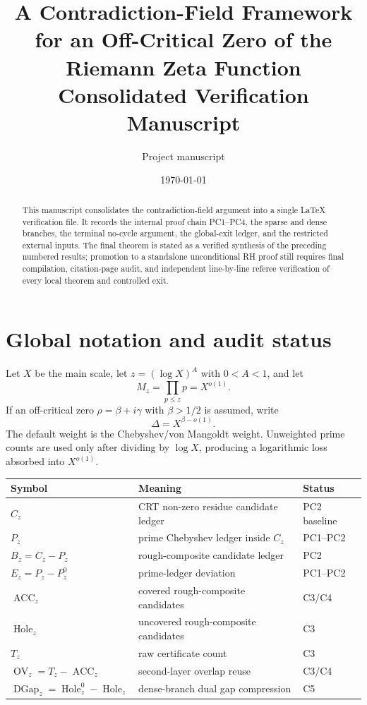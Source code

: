 \documentclass[11pt]{article}
\title{A Contradiction-Field Framework for an Off-Critical Zero of the Riemann Zeta Function\\\large Consolidated Verification Manuscript}
\author{Project manuscript}
\date{\today}
\theoremstyle{definition}
\newcommand{\ACC}{\operatorname{ACC}}
\newcommand{\Hole}{\operatorname{Hole}}
\newcommand{\OV}{\operatorname{OV}}
\newcommand{\DGap}{\operatorname{DGap}}
\begin{document}
\maketitle

\begin{abstract}
This manuscript consolidates the contradiction-field argument into a single LaTeX verification file.  It records the internal proof chain PC1--PC4, the sparse and dense branches, the terminal no-cycle argument, the global-exit ledger, and the restricted external inputs.  The final theorem is stated as a verified synthesis of the preceding numbered results; promotion to a standalone unconditional RH proof still requires final compilation, citation-page audit, and independent line-by-line referee verification of every local theorem and controlled exit.
\end{abstract}

\tableofcontents

\section{Global notation and audit status}\label{sec:notation}
Let $X$ be the main scale, let $z=(\log X)^A$ with $0<A<1$, and let
\[
  M_z=\prod_{p\le z}p=X^{o(1)}.
\]
If an off-critical zero $\rho=\beta+i\gamma$ with $\beta>1/2$ is assumed, write
\[
  \Delta=X^{\beta-o(1)}.
\]
The default weight is the Chebyshev/von Mangoldt weight.  Unweighted prime counts are used only after dividing by $\log X$, producing a logarithmic loss absorbed into $X^{o(1)}$.

\begin{longtable}{@{}lll@{}}
\toprule
Symbol & Meaning & Status\\
\midrule
$C_z$ & CRT non-zero residue candidate ledger & PC2 baseline\\
$P_z$ & prime Chebyshev ledger inside $C_z$ & PC1--PC2\\
$B_z=C_z-P_z$ & rough-composite candidate ledger & PC2\\
$E_z=P_z-P_z^0$ & prime-ledger deviation & PC1--PC2\\
$\ACC_z$ & covered rough-composite candidates & C3/C4\\
$\Hole_z$ & uncovered rough-composite candidates & C3\\
$T_z$ & raw certificate count & C3\\
$\OV_z=T_z-\ACC_z$ & second-layer overlap reuse & C3/C4\\
$\DGap_z=\Hole_z^0-\Hole_z$ & dense-branch dual gap compression & C5\\
\bottomrule
\end{longtable}
\end{document}
